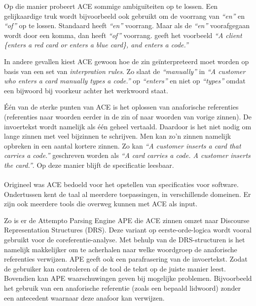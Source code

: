 \documentclass[]{article}
\theoremstyle{definition}
\newcommand{\example}[1]{\textit{``#1''}}
\begin{document}
Op die manier probeert ACE sommige ambiguïteiten op te lossen. Een gelijkaardige truk wordt bijvoorbeeld ook gebruikt om de voorrang van \example{en} en \example{of} op te lossen. Standaard heeft \example{en} voorrang. Maar als de \example{en} voorafgegaan wordt door een komma, dan heeft \example{of} voorrang. \cite{ACEConstructionRules} geeft het voorbeeld \example{A client \{enters a red card or enters a blue card\}, and enters a code.}

In andere gevallen kiest ACE gewoon hoe de zin geïnterpreteerd moet worden op basis van een set van \textit{interpration rules}. Zo slaat de \example{manually} in \example{A customer who {enters a card manually} types a code.}\cite{ACEConstructionRules} op \example{enters} en niet op \example{types} omdat een bijwoord bij voorkeur achter het werkwoord staat.

Één van de sterke punten van ACE is het oplossen van anaforische referenties (referenties naar woorden eerder in de zin of naar woorden van vorige zinnen). De invoertekst wordt namelijk als één geheel vertaald. Daardoor is het niet nodig om lange zinnen met veel bijzinnen te schrijven. Men kan zo'n zinnen namelijk opbreken in een aantal kortere zinnen. Zo kan \example{A customer inserts a card that carries a code.} geschreven worden als \example{A card carries a code. A customer inserts the card.}\cite{Fuchs2008}. Op deze manier blijft de specificatie leesbaar.

\paragraph{} Origineel was ACE bedoeld voor het opstellen van specificaties voor software. Ondertussen kent de taal al meerdere toepassingen, in verschillende domeinen. Er zijn ook meerdere tools die overweg kunnen met ACE als input.

Zo is er de Attempto Parsing Engine APE die ACE zinnen omzet naar Discourse Representation Structures (DRS). Deze variant op eerste-orde-logica wordt vooral gebruikt voor de coreferentie-analyse. Met behulp van de DRS-structuren is het namelijk makkelijker om te acherhalen naar welke woordgroep de anaforische referenties verwijzen. APE geeft ook een parafrasering van de invoertekst. Zodat de gebruiker kan controleren of de tool de tekst op de juiste manier leest. Bovendien kan APE waarschuwingen geven bij mogelijke problemen. Bijvoorbeeld het gebruik van een anaforische referentie (zoals een bepaald lidwoord) zonder een antecedent waarnaar deze anafoor kan verwijzen.
\end{document}
